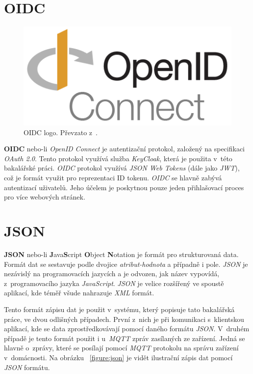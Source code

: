 \newpage

\section{OIDC}
\label{app_prostredi:oidc}

\begin{figure}[hbt]
  \centering
  \includegraphics[width=.35 \linewidth]{obrazky-figures/OIDC.png}
  \caption{OIDC logo. Převzato z~\cite{oidc:logo}.}
\end{figure}

\textbf{OIDC} nebo-li \emph{OpenID Connect} je autentizační protokol, založený na specifikaci \emph{OAuth 2.0}. Tento protokol využívá služba \emph{KeyCloak}, která je použita v~této bakalářské práci.
\emph{OIDC} protokol využívá \emph{JSON Web Tokens} (dále jako \emph{JWT}), což je formát využit pro reprezentaci ID tokenu.
\emph{OIDC} se hlavně zabývá autentizací uživatelů.
Jeho účelem je poskytnou pouze jeden přihlašovací proces pro více webových stránek.~\cite{terminy:oidc}

\section{JSON}
\label{terminy:json}

\textbf{JSON} nebo-li \textbf{J}ava\textbf{S}cript \textbf{O}bject \textbf{N}otation je formát pro strukturovaná data.
Formát dat se sestavuje podle dvojice \emph{atribut-hodnota} a případně i pole.
\emph{JSON} je nezávislý na programovacích jazycích a je odvozen, jak název vypovídá, z~programovacího jazyka \emph{JavaScript}.
\emph{JSON} je velice rozšířený ve spoustě aplikací, kde téměř všude nahrazuje \emph{XML} formát.

Tento formát zápisu dat je použit v~systému, který popisuje tato bakalářská práce, ve dvou odlišných případech.
První z~nich je při komunikaci s~klientskou aplikací, kde se data zprostředkovávají pomocí daného formátu \emph{JSON}.
V~druhém případě je tento formát použit i u~\emph{MQTT} zpráv zasílaných ze zařízení.
Jedná se hlavně o~zprávy, které se posílají pomocí \emph{MQTT} protokolu na správu zařízení v~domácnosti.
Na obrázku ~\ref{figure:json} je vidět ilustrační zápis dat pomocí \emph{JSON} formátu.

